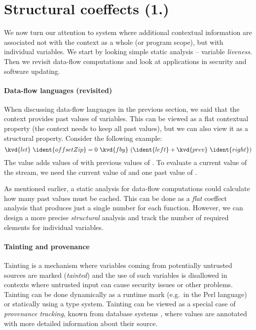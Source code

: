 %
%


\section{Structural coeffects (1.)}

We now turn our attention to system where additional contextual information are associated not
with the context as a whole (or program scope), but with individual variables. We start by looking
simple static analysis -- variable \emph{liveness}. Then we revisit data-flow computations and
look at applications in security and software updating.


\paragraph{Data-flow languages (revisited)}
When discussing data-flow languages in the previous section, we said that the context provides 
past values of variables. This can be viewed as a flat contextual property (the context needs
to keep all past values), but we can also view it as a structural property. Consider the following
example:
%
\begin{equation*}
\kvd{let}~\ident{offsetZip} = 0~\kvd{fby}~(\ident{left} + \kvd{prev}~\ident{right})
\end{equation*}
%
The value  adds values of  with previous values of .
To evaluate a current value of the stream, we need the current value of  and one past
value of . 

As mentioned earlier, a static analysis for data-flow computations could calculate how many past 
values must be cached. This can be done as a \emph{flat} coeffect analysis that produces just a 
single number for each function. However, we can design a more precise \emph{structural} analysis
and track the number of required elements for individual variables.


\paragraph{Tainting and provenance}
Tainting is a mechanism where variables coming from potentially untrusted sources are marked
(\emph{tainted}) and the use of such variables is disallowed in contexts where untrusted input
can cause security issues or other problems. Tainting can be done dynamically as a runtime mark
(e.g.~in the Perl language) or statically using a type system. Tainting can be viewed as a special
case of \emph{provenance tracking}, known from database systems \cite{app-provenance-db}, where
values are annotated with more detailed information about their source.

